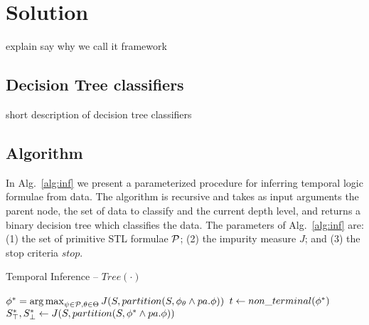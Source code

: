 \section{Solution}\label{sec:solution}
{\color{red} explain say why we call it framework}

\subsection{Decision Tree classifiers} \label{sec:dtree}
short description of decision tree classifiers 

\subsection{Algorithm}
\label{sec:alg}

In Alg.~\ref{alg:inf} we present a parameterized procedure
for inferring temporal logic formulae from data.
The algorithm is recursive and takes as input arguments the
parent node, the set of data to classify and
the current depth level, and returns
a binary decision tree which classifies the data.
The parameters of Alg.~\ref{alg:inf} are:
(1) the set of primitive STL formulae $\mathcal{P}$;
(2) the impurity measure $J$; and
(3) the stop criteria $stop$.

\begin{algorithm}
\caption{Temporal Inference -- $Tree(\cdot)$}
\label{alg:inf}
\DontPrintSemicolon
{}
\BlankLine

$\phi^* = \operatorname*{arg\,max}_{\psi \in \mathcal{P}, \theta \in \Theta} J(S, partition(S, \phi_\theta \wedge pa.\phi))$\;
$t \leftarrow non\_terminal(\phi^*)$\;
$S^*_\top, S^*_\perp \leftarrow J(S, partition(S, \phi^* \wedge pa.\phi))$\;
\end{algorithm}

